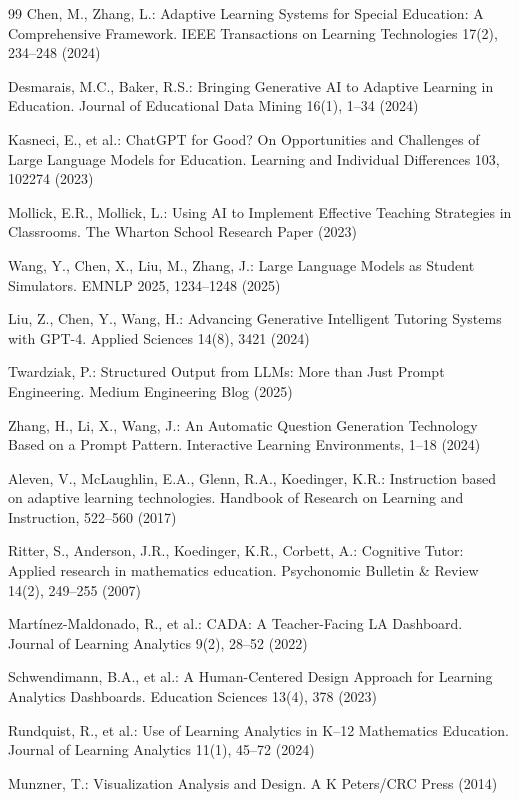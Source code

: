 \documentclass[11pt]{article}
\begin{document}
\begin{thebibliography}{99}
Chen, M., Zhang, L.: Adaptive Learning Systems for Special Education: A Comprehensive Framework. IEEE Transactions on Learning Technologies 17(2), 234--248 (2024)

Desmarais, M.C., Baker, R.S.: Bringing Generative AI to Adaptive Learning in Education. Journal of Educational Data Mining 16(1), 1--34 (2024)

Kasneci, E., et al.: ChatGPT for Good? On Opportunities and Challenges of Large Language Models for Education. Learning and Individual Differences 103, 102274 (2023)

Mollick, E.R., Mollick, L.: Using AI to Implement Effective Teaching Strategies in Classrooms. The Wharton School Research Paper (2023)

Wang, Y., Chen, X., Liu, M., Zhang, J.: Large Language Models as Student Simulators. EMNLP 2025, 1234--1248 (2025)

Liu, Z., Chen, Y., Wang, H.: Advancing Generative Intelligent Tutoring Systems with GPT-4. Applied Sciences 14(8), 3421 (2024)

Twardziak, P.: Structured Output from LLMs: More than Just Prompt Engineering. Medium Engineering Blog (2025)

Zhang, H., Li, X., Wang, J.: An Automatic Question Generation Technology Based on a Prompt Pattern. Interactive Learning Environments, 1--18 (2024)

Aleven, V., McLaughlin, E.A., Glenn, R.A., Koedinger, K.R.: Instruction based on adaptive learning technologies. Handbook of Research on Learning and Instruction, 522--560 (2017)

Ritter, S., Anderson, J.R., Koedinger, K.R., Corbett, A.: Cognitive Tutor: Applied research in mathematics education. Psychonomic Bulletin \& Review 14(2), 249--255 (2007)

Mart\'inez-Maldonado, R., et al.: CADA: A Teacher-Facing LA Dashboard. Journal of Learning Analytics 9(2), 28--52 (2022)

Schwendimann, B.A., et al.: A Human-Centered Design Approach for Learning Analytics Dashboards. Education Sciences 13(4), 378 (2023)

Rundquist, R., et al.: Use of Learning Analytics in K--12 Mathematics Education. Journal of Learning Analytics 11(1), 45--72 (2024)

Munzner, T.: Visualization Analysis and Design. A K Peters/CRC Press (2014)


\end{thebibliography}
\end{document}
